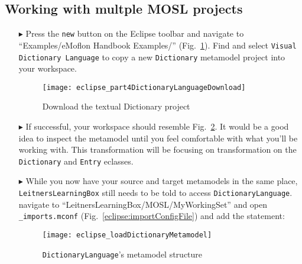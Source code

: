 \newpage
\hypertarget{multiMOSL}{}
\subsection{Working with multple MOSL projects}
\texHeader

\begin{itemize}

\item[$\blacktriangleright$] Press the \texttt{new} button on the Eclipse toolbar and navigate to ``Examples/eMoflon Handbook Examples/''
(Fig.~\ref{eclipse:dictionaryDownloadWizard}). Find and select \texttt{Visual Dictionary Language} to copy a new \texttt{Dictionary} metamodel project into your
workspace.

\begin{figure}[htbp]
\begin{center}
  \texttt{[image: eclipse\_part4DictionaryLanguageDownload]}
  \caption{Download the textual Dictionary project}
  \label{eclipse:dictionaryDownloadWizard}
\end{center}
\end{figure}

\item[$\blacktriangleright$] If successful, your workspace should resemble Fig.~\ref{eclipse:loadedDictionaryMetamodel}. It would be a good idea to inspect the
metamodel until you feel comfortable with what you'll be working with. This transformation will be focusing on transformation on the \texttt{Dictionary} and
\texttt{Entry} eclasses.

\item[$\blacktriangleright$] While you now have your source and target metamodels in the same place, \texttt{LeitnersLearningBox} still needs to be told to
access \texttt{DictionaryLanguage}. navigate to ``LeitnersLearningBox/MOSL/MyWorkingSet'' and open \texttt{\_imports.mconf}
(Fig.~\ref{eclipse:importConfigFile}) and add the statement: 

\newpage

\begin{figure}[htbp]
\begin{center}
  \texttt{[image: eclipse\_loadDictionaryMetamodel]}
  \caption{\texttt{DictionaryLanguage}'s metamodel structure}
  \label{eclipse:loadedDictionaryMetamodel}
\end{center}
\end{figure}

\vspace{1cm}


\end{itemize}

